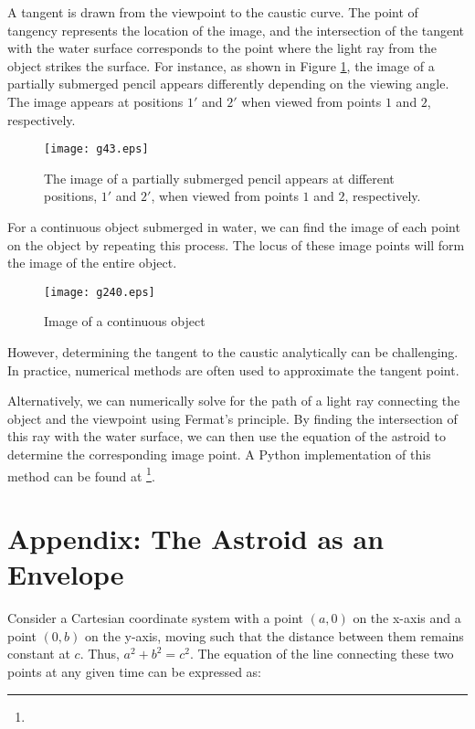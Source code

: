 \documentclass[twocolumn]{article}
\begin{document}
A tangent is drawn from the viewpoint to the caustic curve. The point of tangency represents the location of the image, and the intersection of the tangent with the water surface corresponds to the point where the light ray from the object strikes the surface.
For instance, as shown in Figure \ref{fig:pencil_view}, the image of a partially submerged pencil appears differently depending on the viewing angle. The image appears at positions $1'$ and $2'$ when viewed from points $1$ and $2$, respectively.
\begin{figure}[ht]
	\centering
	\texttt{[image: g43.eps]}
	\caption{The image of a partially submerged pencil appears at different positions, $1'$ and $2'$, when viewed from points $1$ and $2$, respectively.}
	\label{fig:pencil_view}
\end{figure}

For a continuous object submerged in water, we can find the image of each point on the object by repeating this process. The locus of these image points will form the image of the entire object.

\begin{figure}[h]
	\centering
	\texttt{[image: g240.eps]}
	\caption{Image of a continuous object}
	\label{fig:extended_image}
\end{figure}

However, determining the tangent to the caustic analytically can be challenging. In practice, numerical methods are often used to approximate the tangent point.

Alternatively, we can numerically solve for the path of a light ray connecting the object and the viewpoint using Fermat's principle. By finding the intersection of this ray with the water surface, we can then use the equation of the astroid to determine the corresponding image point. A Python implementation of this method can be found at  \href{https://github.com/mingshey/python_projects/blob/main/Refraction_Image_en.ipynb}{}\footnote{}.

\appendix
\newcommand{\pd}[2]{{\frac{\partial #1}{\partial #2}}}
\newcommand{\ilpd}[2]{{{\partial #1}/{\partial #2}}}
\section*{Appendix: The Astroid as an Envelope}

Consider a Cartesian coordinate system with a point $(a, 0)$ on the x-axis and a point $(0, b)$ on the y-axis, moving such that the distance between them remains constant at $c$. Thus, $a^2+b^2=c^2$. The equation of the line connecting these two points at any given time can be expressed as:
\end{document}
